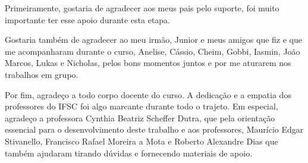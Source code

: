\documentclass[
	12pt,				%
	openright,			%
	oneside,			%
	a4paper,			%
	english,			%
	french,				%
	spanish,			%
	brazil				%
	]{abntex2}
\begin{document}
\frenchspacing 



\imprimircapa
\imprimirfolhaderosto* %

%











\begin{agradecimentos}
Primeiramente, gostaria de agradecer aos meus pais pelo suporte, foi muito importante ter esse apoio durante esta etapa.

Gostaria também de agradecer ao meu irmão, Junior e meus amigos que fiz e que me acompanharam durante o curso,
Anelise,
Cássio,
Cheim,
Gobbi,
Iasmin,
João Marcos,
Lukas e
Nicholas,
pelos bons momentos juntos e por me aturarem nos trabalhos em grupo.

Por fim, agradeço a todo corpo docente do curso.
A dedicação e a empatia dos professores do IFSC foi algo marcante durante todo o trajeto.
Em especial, agradeço a professora Cynthia Beatriz Scheffer Dutra, que pela orientação essencial para o desenvolvimento
deste trabalho e aos professores, Maurício Edgar Stivanello, Francisco Rafael Moreira a Mota e Roberto Alexandre Dias
que também ajudaram tirando dúvidas e fornecendo materiais de apoio.
\end{agradecimentos}
\end{document}
